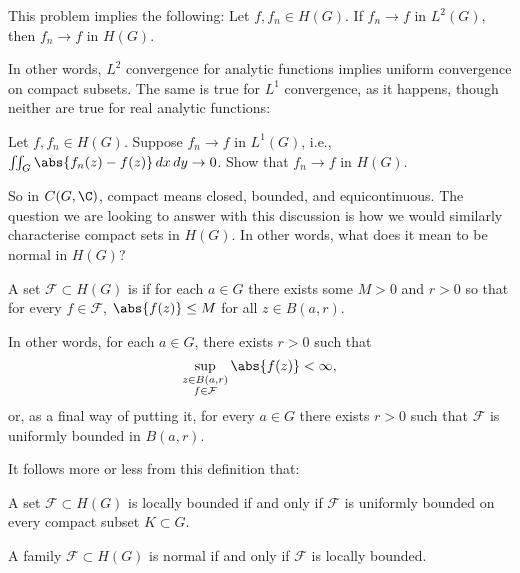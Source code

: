 \begin{remark}
	This problem implies the following:
	Let $f, f_n \in H(G)$.
	If $f_n \to f$ in $L^2(G)$, then $f_n \to f$ in $H(G)$.

	In other words, $L^2$ convergence for analytic functions implies uniform convergence on compact subsets.
	The same is true for $L^1$ convergence, as it happens, though neither are true for real analytic functions:
\end{remark}

\begin{exercise}
	Let $f, f_n \in H(G)$.
	Suppose $f_n \to f$ in $L^1(G)$, i.e., $\iint_G \abs{f_n(z) - f(z)} \, d x \, d y \to 0$.
	Show that $f_n \to f$ in $H(G)$.
\end{exercise}

So in $C(G, \C)$, compact means closed, bounded, and equicontinuous.
The question we are looking to answer with this discussion is how we would similarly characterise compact sets in $H(G)$.
In other words, what does it mean to be normal in $H(G)$?

\begin{definition}
	A set $\mathcal{F} \subset H(G)$ is  if for each $a \in G$ there exists some $M > 0$ and $r > 0$ so that for every $f \in \mathcal{F}$, $\abs{f(z)} \leq M$ for all $z \in B(a, r)$.

	In other words, for each $a \in G$, there exists $r > 0$ such that
	\[
		\sup_{\substack{z \in B(a, r) \\ f \in \mathcal{F}}} \abs{f(z)} < \infty,
	\]
	or, as a final way of putting it, for every $a \in G$ there exists $r > 0$ such that $\mathcal{F}$ is uniformly bounded in $B(a, r)$.
\end{definition}

It follows more or less from this definition that:

\begin{lemma}\label{lem7.9}
	A set $\mathcal{F} \subset H(G)$ is locally bounded if and only if $\mathcal{F}$ is uniformly bounded on every compact subset $K \subset G$.
\end{lemma}

\begin{theorem}\label{thm7.10}
	A family $\mathcal{F} \subset H(G)$ is normal if and only if $\mathcal{F}$ is locally bounded.
\end{theorem}

